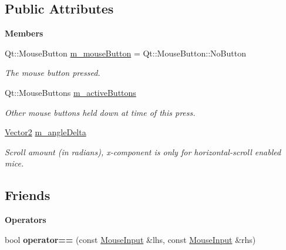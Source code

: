 \subsection*{Public Attributes}
\begin{Indent}\textbf{ Members}\par
\begin{DoxyCompactItemize}
\item 
\mbox{\label{structrev_1_1_mouse_input_ade31ae737b75cbb012ef9f13e279235f}} 
Qt\+::\+Mouse\+Button \mbox{\hyperlink{structrev_1_1_mouse_input_ade31ae737b75cbb012ef9f13e279235f}{m\+\_\+mouse\+Button}} = Qt\+::\+Mouse\+Button\+::\+No\+Button
\begin{DoxyCompactList}\small\item\em The mouse button pressed. \end{DoxyCompactList}\item 
\mbox{\label{structrev_1_1_mouse_input_a1a9d6be52c89bac00a98971fd309a7d2}} 
Qt\+::\+Mouse\+Buttons \mbox{\hyperlink{structrev_1_1_mouse_input_a1a9d6be52c89bac00a98971fd309a7d2}{m\+\_\+active\+Buttons}}
\begin{DoxyCompactList}\small\item\em Other mouse buttons held down at time of this press. \end{DoxyCompactList}\item 
\mbox{\label{structrev_1_1_mouse_input_a39accf704fc44f5c691209fa08315c6d}} 
\mbox{\hyperlink{classrev_1_1_vector}{Vector2}} \mbox{\hyperlink{structrev_1_1_mouse_input_a39accf704fc44f5c691209fa08315c6d}{m\+\_\+angle\+Delta}}
\begin{DoxyCompactList}\small\item\em Scroll amount (in radians), x-\/component is only for horizontal-\/scroll enabled mice. \end{DoxyCompactList}\end{DoxyCompactItemize}
\end{Indent}
\subsection*{Friends}
\begin{Indent}\textbf{ Operators}\par
\begin{DoxyCompactItemize}
\item 
\mbox{\label{structrev_1_1_mouse_input_a971eb39845d01cda9b9b47fe5a009ac7}} 
bool {\bfseries operator==} (const \mbox{\hyperlink{structrev_1_1_mouse_input}{Mouse\+Input}} \&lhs, const \mbox{\hyperlink{structrev_1_1_mouse_input}{Mouse\+Input}} \&rhs)
\end{DoxyCompactItemize}
\end{Indent}
